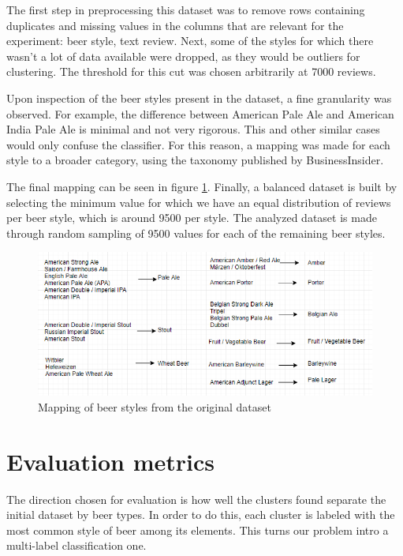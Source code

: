 \documentclass[12pt]{article}
\begin{document}
	The first step in preprocessing this dataset was to remove rows containing duplicates and missing values in the columns that are relevant for the experiment: beer style, text review. Next, some of the styles for which there wasn't a lot of data available were dropped, as they would be outliers for clustering. The threshold for this cut was chosen arbitrarily at 7000 reviews. 
	
	Upon inspection of the beer styles present in the dataset, a fine granularity was observed. For example, the difference between American Pale Ale and American India Pale Ale is minimal and not very rigorous. This and other similar cases would only confuse the classifier. For this reason, a mapping was made for each style to a broader category, using the taxonomy published by BusinessInsider\cite{BeerTaxonomy}. 
	
	The final mapping can be seen in figure \ref{fig:styleMapping}. Finally, a balanced dataset is built by selecting the minimum value for which we have an equal distribution of reviews per beer style, which is around 9500 per style. The analyzed dataset is made through random sampling of 9500 values for each of the remaining beer styles.
	
	\begin{figure}
		\includegraphics[width=\linewidth]{resources/MappingDiagram.png}
		\caption{Mapping of beer styles from the original dataset}
		\label{fig:styleMapping}
	\end{figure}

	\section{Evaluation metrics}
	The direction chosen for evaluation is how well the clusters found separate the initial dataset by beer types. In order to do this, each cluster is labeled with the most common style of beer among its elements. This turns our problem intro a multi-label classification one.
	
\end{document}
